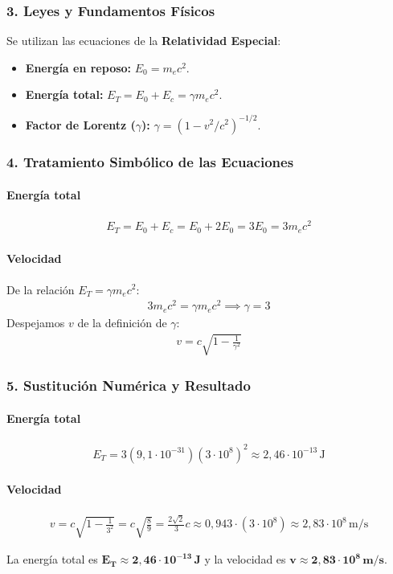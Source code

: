 \subsubsection*{3. Leyes y Fundamentos Físicos}
Se utilizan las ecuaciones de la \textbf{Relatividad Especial}:
\begin{itemize}
    \item \textbf{Energía en reposo:} $E_0 = m_e c^2$.
    \item \textbf{Energía total:} $E_T = E_0 + E_c = \gamma m_e c^2$.
    \item \textbf{Factor de Lorentz ($\gamma$):} $\gamma = (1-v^2/c^2)^{-1/2}$.
\end{itemize}
\subsubsection*{4. Tratamiento Simbólico de las Ecuaciones}
\paragraph{Energía total}
\begin{gather}
    E_T = E_0 + E_c = E_0 + 2E_0 = 3E_0 = 3m_e c^2
\end{gather}
\paragraph{Velocidad}
De la relación $E_T = \gamma m_e c^2$:
\begin{gather}
    3m_e c^2 = \gamma m_e c^2 \implies \gamma = 3
\end{gather}
Despejamos $v$ de la definición de $\gamma$:
\begin{gather}
    v = c\sqrt{1-\frac{1}{\gamma^2}}
\end{gather}
\subsubsection*{5. Sustitución Numérica y Resultado}
\paragraph{Energía total}
\begin{gather}
    E_T = 3(9,1\cdot10^{-31})(3\cdot10^8)^2 \approx 2,46\cdot10^{-13}\,\text{J}
\end{gather}
\paragraph{Velocidad}
\begin{gather}
    v = c\sqrt{1-\frac{1}{3^2}} = c\sqrt{\frac{8}{9}} = \frac{2\sqrt{2}}{3}c \approx 0,943 \cdot (3\cdot10^8) \approx 2,83\cdot10^8\,\text{m/s}
\end{gather}
\begin{cajaresultado}
    La energía total es $\boldsymbol{E_T \approx 2,46\cdot10^{-13}\,\textbf{J}}$ y la velocidad es $\boldsymbol{v \approx 2,83\cdot10^8\,\textbf{m/s}}$.
\end{cajaresultado}
